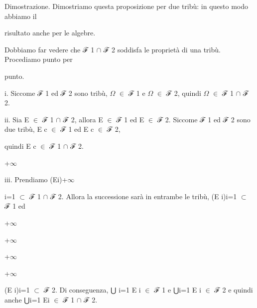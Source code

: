 \documentclass[a4paper,portrait,12pt]{article}
\begin{document}
\begin{flushleft}
Dimostrazione. Dimostriamo questa proposizione per due tribù: in questo modo abbiamo il
\end{flushleft}


\begin{flushleft}
risultato anche per le algebre.
\end{flushleft}


\begin{flushleft}
Dobbiamo far vedere che ℱ 1 $\cap$ ℱ 2 soddisfa le propriet\`{a} di una tribù. Procediamo punto per
\end{flushleft}


\begin{flushleft}
punto.
\end{flushleft}


\begin{flushleft}
i. Siccome ℱ 1 ed ℱ 2 sono tribù, $\Omega$ $\in$ ℱ 1 e $\Omega$ $\in$ ℱ 2, quindi $\Omega$ $\in$ ℱ 1 $\cap$ ℱ 2.
\end{flushleft}


\begin{flushleft}
ii. Sia E $\in$ ℱ 1 $\cap$ ℱ 2, allora E $\in$ ℱ 1 ed E $\in$ ℱ 2. Siccome ℱ 1 ed ℱ 2 sono due tribù, E c $\in$ ℱ 1 ed E c $\in$ ℱ 2,
\end{flushleft}


\begin{flushleft}
quindi E c $\in$ ℱ 1 $\cap$ ℱ 2.
\end{flushleft}


+$\infty$


\begin{flushleft}
iii. Prendiamo (Ei)+$\infty$
\end{flushleft}


\begin{flushleft}
i=1 $\subset$ ℱ 1 $\cap$ ℱ 2. Allora la successione sar\`{a} in entrambe le tribù, (E i)i=1 $\subset$ ℱ 1 ed
\end{flushleft}


+$\infty$


+$\infty$


+$\infty$


+$\infty$


\begin{flushleft}
(E i)i=1 $\subset$ ℱ 2. Di conseguenza, ⋃ i=1 E i $\in$ ℱ 1 e ⋃i=1 E i $\in$ ℱ 2 e quindi anche ⋃i=1 Ei $\in$ ℱ 1 $\cap$ ℱ 2.
\end{flushleft}
\end{document}
